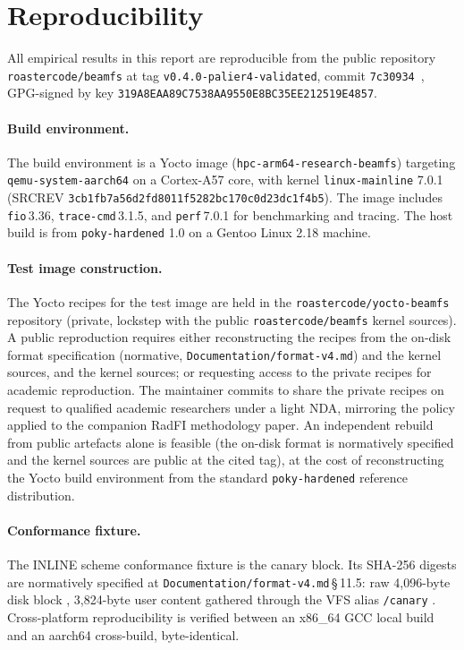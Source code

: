 \section{Reproducibility}\label{sec:repro}

All empirical results in this report are reproducible from the
public repository \texttt{roastercode/beamfs} at tag
\texttt{v0.4.0-palier4-validated}, commit
\texttt{7c30934}~\cite{beamfs-impl}, GPG-signed by key
\texttt{319A8EAA89C7538AA9550E8BC35EE212519E4857}.

\paragraph{Build environment.}
The build environment is a Yocto image
(\texttt{hpc-arm64-research-beamfs}) targeting
\texttt{qemu-system-aarch64} on a Cortex-A57 core, with kernel
\texttt{linux-mainline} 7.0.1 (SRCREV
\texttt{3cb1fb7a56d2fd8011f5282bc170c0d23dc1f4b5}). The image
includes \texttt{fio}\,3.36, \texttt{trace-cmd}\,3.1.5, and
\texttt{perf}\,7.0.1 for benchmarking and tracing. The host
build is from \texttt{poky-hardened} 1.0 on a Gentoo Linux 2.18
machine.

\paragraph{Test image construction.}
The Yocto recipes for the test image are held in the
\texttt{roastercode/yocto-beamfs} repository (private, lockstep
with the public \texttt{roastercode/beamfs} kernel sources). A
public reproduction requires either reconstructing the recipes
from the on-disk format specification (normative,
\texttt{Documentation/format-v4.md}) and the kernel sources, and the kernel sources;
or requesting access to the private recipes for academic
reproduction. The maintainer commits to share the private recipes
on request to qualified academic researchers under a light NDA,
mirroring the policy applied to the companion RadFI methodology
paper. An independent rebuild from public artefacts alone is
feasible (the on-disk format is normatively specified and the
kernel sources are public at the cited tag), at the cost of
reconstructing the Yocto build environment from the standard
\texttt{poky-hardened} reference distribution.

\paragraph{Conformance fixture.}
The INLINE scheme conformance fixture is the canary block. Its
SHA-256 digests are normatively specified at
\texttt{Documentation/format-v4.md}\,\S\,11.5:
raw 4{,}096-byte disk block
\texttt{},
3{,}824-byte user content gathered through the VFS alias
\texttt{/canary}
\texttt{}.
Cross-platform reproducibility is verified between an x86\_64 GCC
local build and an aarch64 cross-build, byte-identical.

